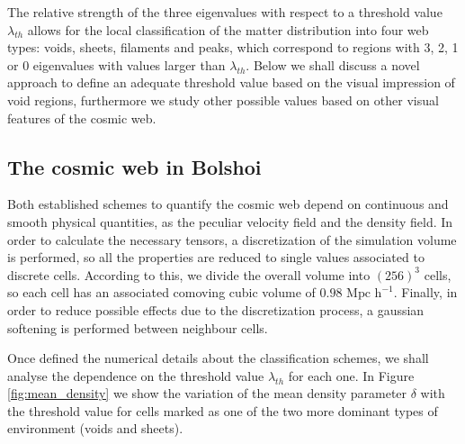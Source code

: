 \documentclass[a4,useAMS,usenatbib,usegraphicx]{latex/mn2e}
\begin{document}
The relative strength of the three eigenvalues with respect to a threshold
value $\lambda_{th}$ allows for the local classification of the matter 
distribution into four web types: voids, sheets, filaments and peaks, 
which correspond to regions with 3, 2, 1 or 0 eigenvalues with values 
larger than $\lambda_{th}$. Below we shall discuss a novel approach to 
define an adequate threshold value based on the visual impression of void
regions, furthermore we study other possible values based on other visual
features of the cosmic web.



\subsection{The cosmic web in Bolshoi}
\label{subsec:web_in_simulations}



Both established schemes to quantify the cosmic web depend on continuous 
and smooth physical quantities, as the peculiar velocity field and the 
density field. In order to calculate the necessary tensors, a discretization
of the simulation volume is performed, so all the properties are reduced 
to single values associated to discrete cells. According to this, we divide 
the overall volume into $(256)^3$ cells, so each cell has an associated 
comoving cubic volume of $0.98 \mbox{ Mpc h}^{-1}$. Finally, in order to 
reduce possible effects due to the discretization process, a gaussian 
softening is performed between neighbour cells.



Once defined the numerical details about the classification schemes, we 
shall analyse the dependence on the threshold value $\lambda_{th}$ for each 
one. In Figure \ref{fig:mean_density} we show the variation of the mean 
density parameter $\delta$ with the threshold value for cells marked as one 
of the two more dominant types of environment (voids and sheets).
\end{document}
